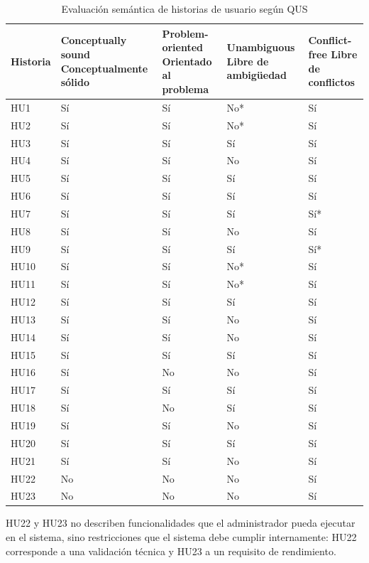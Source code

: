 \begin{longtable}{|l|p{2.5cm}|p{3cm}|p{2.5cm}|p{2.5cm}|}
\caption{Evaluación semántica de historias de usuario según QUS}
\label{table:sem1} \\
\hline
\textbf{Historia}
& \textbf{Conceptually sound} \newline Conceptualmente sólido
& \textbf{Problem-oriented} \newline Orientado al problema
& \textbf{Unambiguous} \newline Libre de ambigüedad
& \textbf{Conflict-free} \newline Libre de conflictos \\ \hline
  HU1  & Sí & Sí & No* & Sí \\ \hline
  HU2  & Sí & Sí & No* & Sí \\ \hline
  HU3  & Sí & Sí & Sí  & Sí \\ \hline
  HU4  & Sí & Sí & No  & Sí \\ \hline
  HU5  & Sí & Sí & Sí  & Sí \\ \hline
  HU6  & Sí & Sí & Sí  & Sí \\ \hline
  HU7  & Sí & Sí & Sí  & Sí* \\ \hline
  HU8  & Sí & Sí & No  & Sí \\ \hline
  HU9  & Sí & Sí & Sí  & Sí* \\ \hline
  HU10 & Sí & Sí & No* & Sí \\ \hline
  HU11 & Sí & Sí & No* & Sí \\ \hline
  HU12 & Sí & Sí & Sí  & Sí \\ \hline
  HU13 & Sí & Sí & No  & Sí \\ \hline
  HU14 & Sí & Sí & No  & Sí \\ \hline
  HU15 & Sí & Sí & Sí  & Sí \\ \hline
  HU16 & Sí & No & No  & Sí \\ \hline
  HU17 & Sí & Sí & Sí  & Sí \\ \hline
  HU18 & Sí & No & Sí  & Sí \\ \hline
  HU19 & Sí & Sí & No  & Sí \\ \hline
  HU20 & Sí & Sí & Sí  & Sí \\ \hline
  HU21 & Sí & Sí & No  & Sí \\ \hline
  HU22 & No & No & No & Sí \\ \hline
  HU23 & No & No & No & Sí \\ \hline
\end{longtable}

HU22 y HU23 no describen funcionalidades que el administrador pueda ejecutar en el sistema, sino restricciones que el sistema debe cumplir internamente: HU22 corresponde a una validación técnica y HU23 a un requisito de rendimiento.

